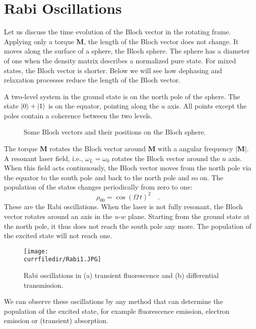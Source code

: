 \section{Rabi Oscillations}

Let us discuss the time evolution of the Bloch vector in the rotating frame. Applying only a torque $\boldsymbol{M}$, the length of the Bloch vector does not change. It moves along the surface of a sphere, the Bloch sphere. The sphere has a diameter of one when the density matrix describes a normalized pure state. For mixed states, the Bloch vector is shorter. Below we will see how dephasing and relaxation processes reduce the length of the Bloch vector.


A two-level system in the ground state is on the north pole of the sphere. The state $\ket{0} + \ket{1}$ is on the equator, pointing along the $u$ axis. All points except the poles contain a coherence between the two levels.


\begin{figure}
\caption{Some Bloch vectors and their positions on the Bloch sphere.}
\end{figure}


The torque $\boldsymbol{M}$ rotates the Bloch vector around  $\boldsymbol{M}$ with a angular frequency  $|\boldsymbol{M}|$. A resonant laser field, i.e., $\omega_L = \omega_0$ rotates the Bloch vector around the $u$ axis. When this field acts continuously, the Bloch vector moves from the north pole via the equator to the south pole and back to the north pole and so on. The population of the states changes periodically from zero to one:
\[
 \rho_{00} = \cos ( \Omega \, t)^2 \quad .
\]
These are the Rabi oscillations. When the laser is not fully resonant, the Bloch vector rotates around an axis in the $u$-$w$ plane. Starting from the ground state at the north pole, it thus does not reach the south pole any more. The population of the excited state will  not reach one.

\begin{figure} 
    \centering
    \texttt{[image: \\currfiledir/Rabi1.JPG]}
    \caption{Rabi oscillations in (a) transient fluorescence and (b) differential transmission.}
    \label{fig:Rabi}
\end{figure}

We can observe these oscillations by any method that can determine the population of the excited state, for example fluorescence emission, electron emission or (transient) absorption.


